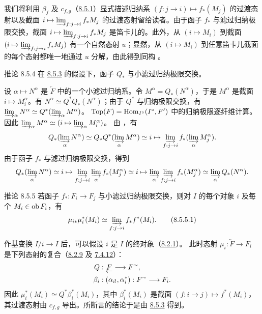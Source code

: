 \noindent 我们\pageoriginale{}将利用 $\beta_f$  及
$c_{f,g}$（\hyperref[VI.subsubsec8.5.1]{8.5.1}）显式描述归纳系
$(f:j\to i)\mapsto f_{\ast}(M_j)$ 的过渡态射以及截面
$i\mapsto\varinjlim_{f:j\to i}f_{\ast}M_j$ 的过渡态射留给读者。由于函子
$f_{\ast}$ 与滤过归纳极限交换，截面
$i\mapsto\varinjlim_{f:j\to i}f_{\ast}M_j$ 是笛卡儿的。此外，从
$(i\mapsto M_i)$ 到截面
$(i\mapsto\varinjlim_{f:j\to i}f_{\ast}M_j)$ 有一个自然态射 $u$；显然，从
$(i\mapsto M_i)$ 到任意笛卡儿截面的每个态射都唯一地通过 $u$ 分解，由此得到同构
。

\begin{enonce*}{推论 8.5.4}
在 \hyperref[VI.prop8.5.3]{8.5.3} 的假设下，函子 $Q_{\ast}$ 与小滤过归纳极限交换。
\end{enonce*}

设 $\alpha\mapsto N^{\alpha}$ 是 $\underleftarrow{F}$ 中的一个小滤过归纳系。令
$M^{\alpha}=Q_{\ast}(N^{\alpha})$，于是 $M^{\alpha}$ 是截面
$i\mapsto M_i^{\alpha}$。有 $N^{\alpha}\simeq Q^{\ast}Q_{\ast}(N^{\alpha})$；由于
$Q^{\ast}$ 与归纳极限交换，有
$\varinjlim_{\alpha}N^{\alpha}\simeq Q^{\ast}(\varinjlim_{\alpha}M^{\alpha})$。
$\operatorname{Top}(F)=\operatorname{Hom}_{I^{\circ}}(I^{\circ},F')$ 中的归纳极限逐纤维计算。因此
$\varinjlim_{\alpha}M^{\alpha}\simeq (i\mapsto\varinjlim_{\alpha}M_i^{\alpha})$。
由 ，有
$$
Q_{\ast} (\varinjlim_{\alpha} {N}^{\alpha}) \simeq Q_{\ast}
Q^{\ast} (\varinjlim_{\alpha} {M}^{\alpha}) \simeq i \mapsto
\varinjlim_{f : j \to i} f_{\ast}
(\varinjlim_{\alpha} {M}^{\alpha}_j){\quoi}.
$$
由于函子 $f_{\ast}$ 与滤过归纳极限交换，得到
$$
Q_{\ast} (\varinjlim_{\alpha} {N}^{\alpha}) \simeq i \mapsto
\varinjlim_{f: j\to i} \varinjlim_{\alpha} f_{\ast}
(M^{\alpha}_j) \simeq i \mapsto \varinjlim_{\alpha} \varinjlim_{f:
  j\to i} f_{\ast}
(M^{\alpha}_j) \simeq \varinjlim_{\alpha} Q_{\ast} (N^{\alpha}){\quoi}.
$$

\begin{enonce*}{推论 8.5.5}
若函子 $f_{\ast}:F_i\to F_j$ 与小滤过归纳极限交换，则对 $I$ 的每个对象 $i$ 及每个
$M_i\in\operatorname{ob} F_i$，有
\begin{equation*}
\mu_{i\ast} \mu_{i}^{\ast} (M_i) \simeq \varinjlim_{f : j \to
      i} f_{\ast} f^{\ast}(M_i){\quoi}.\tag{8.5.5.1}
\end{equation*}
\end{enonce*}
\noindent
作基变换 $I/i\to I$ 后，可以假设 $i$ 是 $I$ 的终对象（\hyperref[VI.lem8.2.1]{8.2.1}）。
此时态射 $\mu_i:\underleftarrow{F}\to F_i$ 是下列态射的复合\pageoriginale{}（\hyperref[VI.thm8.2.9]{8.2.9} 及
\hyperref[VI.lem7.4.12]{7.4.12}）：
\begin{align*}
Q &: \underleftarrow{F} \to F^{\sim}{\quoi},\\
\beta_i &: (\alpha_{i!}, \alpha^{\ast}_i) : F^{\sim} \to F_i{\quoi}.
\end{align*}
因此 $\mu_i^{\ast}(M_i)\simeq Q^{\ast}\beta_i^{\ast}(M_i)$，其中
$\beta_i^{\ast}(M_i)$ 是截面 $(f:i\to j)\mapsto f^{\ast}(M_i)$，其过渡态射由
$c_{f,g}$ 导出。所断言的结论于是由 \hyperref[VI.prop8.5.3]{8.5.3} 得到。

